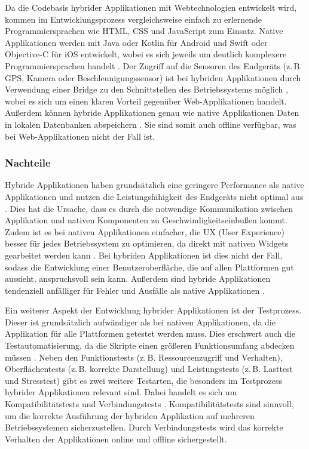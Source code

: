 \documentclass[]{lni}
\begin{document}
Da die Codebasis hybrider Applikationen mit Webtechnologien entwickelt wird, kommen im Entwicklungsprozess vergleichsweise einfach zu erlernende Programmiersprachen wie HTML, CSS und JavaScript zum Einsatz. Native Applikationen werden mit Java oder Kotlin für Android und Swift oder Objective-C für iOS entwickelt, wobei es sich jeweils um deutlich komplexere Programmiersprachen handelt \cite{Tyshchenko.19.06.2020}. Der Zugriff auf die Sensoren des Endgeräts (z.\,B. GPS, Kamera oder Beschleunigungssensor) ist bei hybriden Applikationen durch Verwendung einer Bridge zu den Schnittstellen des Betriebssystems möglich \cite{Que.2016}, wobei es sich um einen klaren Vorteil gegenüber Web-Applikationen handelt. Außerdem können hybride Applikationen genau wie native Applikationen Daten in lokalen Datenbanken abspeichern \cite{Denko.2021}. Sie sind somit auch offline verfügbar, was bei Web-Applikationen nicht der Fall ist.

\subsubsection*{Nachteile}
Hybride Applikationen haben grundsätzlich eine geringere Performance als native Applikationen und nutzen die Leistungsfähigkeit des Endgeräts nicht optimal aus \cite{Kleinschrod.2020}. Dies hat die Ursache, dass es durch die notwendige Kommunikation zwischen Applikation und nativen Komponenten zu Geschwindigkeitseinbußen kommt. Zudem ist es bei nativen Applikationen einfacher, die UX (User Experience) besser für jedes Betriebssystem zu optimieren, da direkt mit nativen Widgets gearbeitet werden kann \cite{Cowart.2012}. Bei hybriden Applikationen ist dies nicht der Fall, sodass die Entwicklung einer Benutzeroberfläche, die auf allen Plattformen gut aussieht, anspruchsvoll sein kann. Außerdem sind hybride Applikationen tendenziell anfälliger für Fehler und Ausfälle als native Applikationen \cite{Tyshchenko.19.06.2020}.

Ein weiterer Aspekt der Entwicklung hybrider Applikationen ist der Testprozess. Dieser ist grundsätzlich aufwändiger als bei nativen Applikationen, da die Applikation für alle Plattformen getestet werden muss. Dies erschwert auch die Testautomatisierung, da die Skripte einen größeren Funktionsumfang abdecken müssen \cite{Tyshchenko.19.06.2020}. Neben den Funktionstests (z.\,B. Ressourcenzugriff und Verhalten), Oberflächentests (z.\,B. korrekte Darstellung) und Leistungstests (z.\,B. Lasttest und Stresstest) gibt es zwei weitere Testarten, die besonders im Testprozess hybrider Applikationen relevant sind. Dabei handelt es sich um Kompatibilitätstests und Verbindungstests \cite{Tyshchenko.19.06.2020}. Kompatibilitätstests sind sinnvoll, um die korrekte Ausführung der hybriden Applikation auf mehreren Betriebssystemen sicherzustellen. Durch Verbindungstests wird das korrekte Verhalten der Applikationen online und offline sichergestellt.
\end{document}
